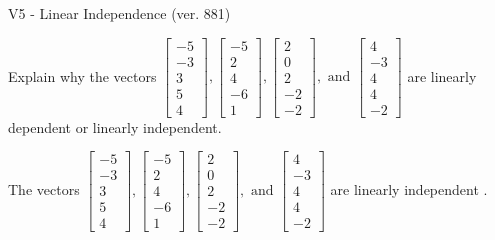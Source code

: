 \begin{exercise}
  \begin{exerciseTitle}V5 - Linear Independence (ver. 881)\end{exerciseTitle}
  \begin{exerciseStatement}
    Explain why the vectors \(\left[\begin{array}{r}
-5 \\
-3 \\
3 \\
5 \\
4
\end{array}\right] , \left[\begin{array}{r}
-5 \\
2 \\
4 \\
-6 \\
1
\end{array}\right] , \left[\begin{array}{r}
2 \\
0 \\
2 \\
-2 \\
-2
\end{array}\right] , \text{ and } \left[\begin{array}{r}
4 \\
-3 \\
4 \\
4 \\
-2
\end{array}\right]\) are linearly dependent or linearly independent.	


  \end{exerciseStatement}
  \begin{exerciseAnswer}
   The vectors \(\left[\begin{array}{r}
-5 \\
-3 \\
3 \\
5 \\
4
\end{array}\right] , \left[\begin{array}{r}
-5 \\
2 \\
4 \\
-6 \\
1
\end{array}\right] , \left[\begin{array}{r}
2 \\
0 \\
2 \\
-2 \\
-2
\end{array}\right] , \text{ and } \left[\begin{array}{r}
4 \\
-3 \\
4 \\
4 \\
-2
\end{array}\right]\) are 
  	 linearly independent  .
  


  \end{exerciseAnswer}
\end{exercise}